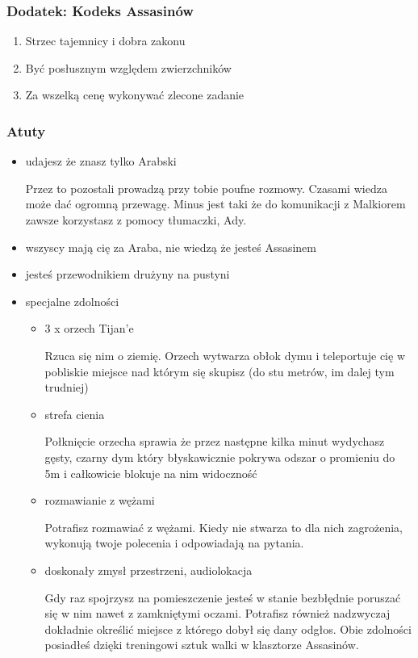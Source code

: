 \documentclass[11pt]{article}
\begin{document}
\subsubsection*{Dodatek: Kodeks Assasinów}
\label{sec-3.1.4}

\begin{enumerate}
\item Strzec tajemnicy i dobra zakonu
\item Być posłusznym względem zwierzchników
\item Za wszelką cenę wykonywać zlecone zadanie
\end{enumerate}
\subsubsection*{Atuty}
\label{sec-3.1.5}

\begin{itemize}
\item udajesz że znasz tylko Arabski

      Przez to pozostali prowadzą przy tobie poufne rozmowy. Czasami
      wiedza może dać ogromną przewagę. Minus jest taki że do
      komunikacji z Malkiorem zawsze korzystasz z pomocy tłumaczki, Ady.
\item wszyscy mają cię za Araba, nie wiedzą że jesteś Assasinem
\item jesteś przewodnikiem drużyny na pustyni
\item specjalne zdolności

\begin{itemize}
\item 3 x orzech Tijan'e

        Rzuca się nim o ziemię. Orzech wytwarza obłok dymu i teleportuje
        cię w pobliskie miejsce nad którym się skupisz (do stu metrów,
        im dalej tym trudniej)
\item strefa cienia

        Połknięcie orzecha sprawia że przez następne kilka minut
        wydychasz gęsty, czarny dym który błyskawicznie pokrywa odszar
        o promieniu do 5m i całkowicie blokuje na nim widoczność
\item rozmawianie z wężami

        Potrafisz rozmawiać z wężami. Kiedy nie stwarza to dla nich
        zagrożenia, wykonują twoje polecenia i odpowiadają na pytania.
\item doskonały zmysł przestrzeni, audiolokacja

        Gdy raz spojrzysz na pomieszczenie jesteś w stanie bezbłędnie
        poruszać się w nim nawet z zamkniętymi oczami. Potrafisz
        również nadzwyczaj dokładnie określić miejsce z którego dobył
        się dany odgłos. Obie zdolności posiadłeś dzięki treningowi
        sztuk walki w klasztorze Assasinów.
\end{itemize}

\end{itemize}
\end{document}

